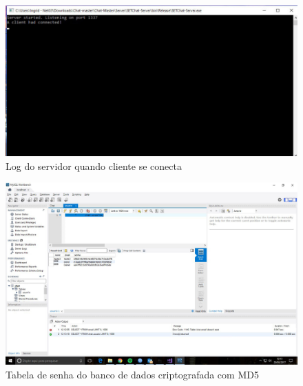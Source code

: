 \begin{figure}[!htb]
	\centering
	\includegraphics[scale=0.4]{img/t-log-server.jpeg}
	\caption{Log do servidor quando cliente se conecta}
	\label{Log do servidor quando cliente se conecta}
\end{figure}

\begin{figure}[!htb]
	\centering
	\includegraphics[scale=0.25]{img/t-banco-senha-cripto.jpeg}
	\caption{Tabela de senha do banco de dados criptografada com MD5}
	\label{Tabela de senha do banco de dados criptografada com MD5}
\end{figure}


